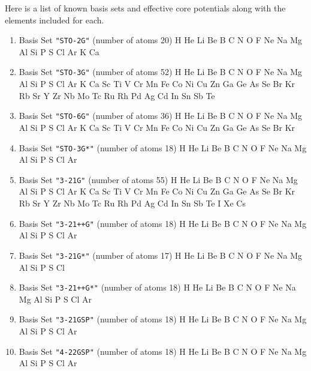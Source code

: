 \sloppy
Here is a list of known basis sets and effective core potentials along
with the elements included for each.
\begin{enumerate}

\item Basis Set \verb#"STO-2G"# (number of atoms 20) \newline
  H He Li Be B C N O F Ne Na Mg Al Si P S Cl Ar K Ca


\item Basis Set \verb#"STO-3G"# (number of atoms 52) \newline
  H He Li Be B C N O F Ne Na Mg Al Si P S Cl Ar K Ca Sc Ti V Cr Mn
 Fe Co Ni Cu Zn Ga Ge As Se Br Kr Rb Sr Y Zr Nb Mo Tc Ru Rh Pd Ag Cd In Sn
 Sb Te


\item Basis Set \verb#"STO-6G"# (number of atoms 36) \newline
  H He Li Be B C N O F Ne Na Mg Al Si P S Cl Ar K Ca Sc Ti V Cr Mn
 Fe Co Ni Cu Zn Ga Ge As Se Br Kr


\item Basis Set \verb#"STO-3G*"# (number of atoms 18) \newline
  H He Li Be B C N O F Ne Na Mg Al Si P S Cl Ar


\item Basis Set \verb#"3-21G"# (number of atoms 55) \newline
  H He Li Be B C N O F Ne Na Mg Al Si P S Cl Ar K Ca Sc Ti V Cr Mn
 Fe Co Ni Cu Zn Ga Ge As Se Br Kr Rb Sr Y Zr Nb Mo Tc Ru Rh Pd Ag Cd In Sn
 Sb Te I Xe Cs


\item Basis Set \verb#"3-21++G"# (number of atoms 18) \newline
  H He Li Be B C N O F Ne Na Mg Al Si P S Cl Ar


\item Basis Set \verb#"3-21G*"# (number of atoms 17) \newline
  H He Li Be B C N O F Ne Na Mg Al Si P S Cl


\item Basis Set \verb#"3-21++G*"# (number of atoms 18) \newline
  H He Li Be B C N O F Ne Na Mg Al Si P S Cl Ar


\item Basis Set \verb#"3-21GSP"# (number of atoms 18) \newline
  H He Li Be B C N O F Ne Na Mg Al Si P S Cl Ar


\item Basis Set \verb#"4-22GSP"# (number of atoms 18) \newline
  H He Li Be B C N O F Ne Na Mg Al Si P S Cl Ar



\end{enumerate}
